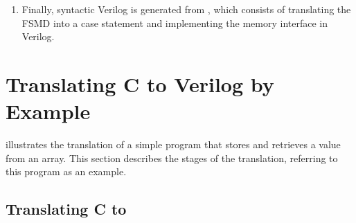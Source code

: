 \begin{enumerate}[label=\protect\blacknum{\arabic*}]
\begin{center}
\end{center}
%
The two versions are semantically equivalent, but we find that the second, in
which both right-hand sides must be evaluated before either assignment is
performed, makes the downstream logic synthesis tools more likely to produce the
hardware we intend (which, in this particular example, involves exploiting a
fused multiply--accumulator unit if available).%
\footnote{As the example shows, forward substitution does not remove duplicate
  writes to a variable because Verilog semantics explicitly state that the order
  of nonblocking assignments to the same variable will be
  preserved~\cite[p.~254]{ieee24_iss}.}
\item Finally, syntactic Verilog is generated from \htl{}, which consists of
  translating the \gls{FSMD} into a case statement and implementing the memory
  interface in Verilog.
\end{enumerate}

\section{Translating C to Verilog by Example}%
\label{sec:itv:translating-c-to-verilog}

 illustrates the translation of a simple program
that stores and retrieves a value from an array.  This section describes the
stages of the \vericert{} translation, referring to this program as an example.

\subsection{Translating C to \rtl{}}


